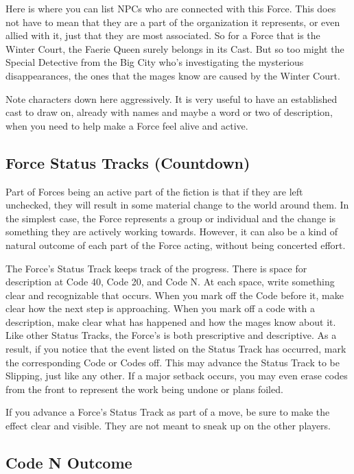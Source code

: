 \documentclass[10pt,twoside,openright]{memoir}
\begin{document}
Here is where you can list NPCs who are connected with this Force. This
does not have to mean that they are a part of the organization it
represents, or even allied with it, just that they are most associated.
So for a Force that is the Winter Court, the Faerie Queen surely belongs
in its Cast. But so too might the Special Detective from the Big City
who's investigating the mysterious disappearances, the ones that the
mages know are caused by the Winter Court.

Note characters down here aggressively. It is very useful to have an
established cast to draw on, already with names and maybe a word or two
of description, when you need to help make a Force feel alive and
active.

\hypertarget{force-status-tracks-countdown}{%
\subsection{Force Status Tracks
(Countdown)}\label{force-status-tracks-countdown}}

Part of Forces being an active part of the fiction is that if they are
left unchecked, they will result in some material change to the world
around them. In the simplest case, the Force represents a group or
individual and the change is something they are actively working
towards. However, it can also be a kind of natural outcome of each part
of the Force acting, without being concerted effort.

The Force's Status Track keeps track of the progress. There is space for
description at Code 40, Code 20, and Code N. At each space, write
something clear and recognizable that occurs. When you mark off the Code
before it, make clear how the next step is approaching. When you mark
off a code with a description, make clear what has happened and how the
mages know about it. Like other Status Tracks, the Force's is both
prescriptive and descriptive. As a result, if you notice that the event
listed on the Status Track has occurred, mark the corresponding Code or
Codes off. This may advance the Status Track to be Slipping, just like
any other. If a major setback occurs, you may even erase codes from the
front to represent the work being undone or plans foiled.

If you advance a Force's Status Track as part of a move, be sure to make
the effect clear and visible. They are not meant to sneak up on the
other players.

\hypertarget{code-n-outcome}{%
\subsection{Code N Outcome}\label{code-n-outcome}}
\end{document}
